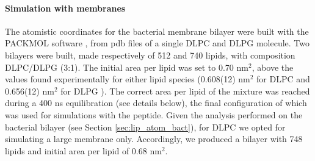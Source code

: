 

\paragraph{Simulation with membranes} The atomistic coordinates for the bacterial membrane bilayer were built with the PACKMOL software \citep{Martinez2009}, from pdb files of a single DLPC \citep{PogerOrig} and DLPG \citep{Kukol2009} molecule. Two bilayers were built, made respectively of 512 and 740 lipids, with composition DLPC/DLPG (3:1). The initial area per lipid was set to 0.70 nm$^2$, above the values found experimentally for either lipid species (0.608(12) nm$^2$ for DLPC \citep{Kucerka2011} and 0.656(12) nm$^2$ for DLPG \citep{Pan2012}). The correct area per lipid of the mixture was reached during a 400 ns equilibration (see details below), the final configuration of which was used for simulations with the peptide.
Given the analysis performed on the bacterial bilayer (see Section \ref{sec:lip_atom_bact}), for DLPC we opted for simulating a large membrane only. Accordingly, we produced a bilayer with 748 lipids and initial area per lipid of 0.68 nm$^2$.


